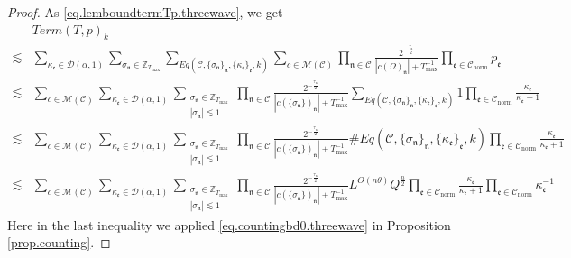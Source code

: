 \begin{proof}
As \eqref{eq.lemboundtermTp.threewave}, we get
\begin{equation}\label{eq.lemboundtermTpop.threewave}
\begin{split}
    &Term(T, p)_k
    \\
    \lesssim& \sum_{\kappa_{\mathfrak{e}}\in \mathcal{D}(\alpha,1)}\sum_{\sigma_{\mathfrak{n}}\in \mathbb{Z}_{T_{\text{max}}}}\sum_{Eq(\mathcal{C}, \{\sigma_{\mathfrak{n}}\}_{\mathfrak{n}}, \{\kappa_{\mathfrak{e}}\}_{\mathfrak{e}},k)} \sum_{c\in \mathscr{M}(\mathcal{C}) }\prod_{\mathfrak{n}\in \mathcal{C}}\frac{2^{-\frac{\tau_{\mathfrak{n}}}{2}}}{|c(\Omega)_{\mathfrak{n}}|+T^{-1}_{\text{max}}} \prod_{\mathfrak{e}\in \mathcal{C}_{\text{norm}}} p_{\mathfrak{e}}
    \\
    \lesssim &\sum_{c\in \mathscr{M}(\mathcal{C}) }\sum_{\kappa_{\mathfrak{e}}\in \mathcal{D}(\alpha,1)}\sum_{\substack{\sigma_{\mathfrak{n}}\in \mathbb{Z}_{T_{\text{max}}}\\ |\sigma_{\mathfrak{n}}|\lesssim 1}}\prod_{\mathfrak{n}\in \mathcal{C}}\frac{2^{-\frac{\tau_{\mathfrak{n}}}{2}}}{|c(\{\sigma_{\mathfrak{n}}\})_{\mathfrak{n}}|+T^{-1}_{\text{max}}} \sum_{Eq(\mathcal{C}, \{\sigma_{\mathfrak{n}}\}_{\mathfrak{n}}, \{\kappa_{\mathfrak{e}}\}_{\mathfrak{e}},k)} 1 \prod_{\mathfrak{e}\in \mathcal{C}_{\text{norm}}} \frac{\kappa_{\mathfrak{e}}}{\kappa_{\mathfrak{e}}+1}
    \\
    \lesssim &\sum_{c\in \mathscr{M}(\mathcal{C}) }\sum_{\kappa_{\mathfrak{e}}\in \mathcal{D}(\alpha,1)}\sum_{\substack{\sigma_{\mathfrak{n}}\in \mathbb{Z}_{T_{\text{max}}}\\ |\sigma_{\mathfrak{n}}|\lesssim 1}}\prod_{\mathfrak{n}\in \mathcal{C}}\frac{2^{-\frac{\tau_{\mathfrak{n}}}{2}}}{|c(\{\sigma_{\mathfrak{n}}\})_{\mathfrak{n}}|+T^{-1}_{\text{max}}} \#Eq(\mathcal{C}, \{\sigma_{\mathfrak{n}}\}_{\mathfrak{n}}, \{\kappa_{\mathfrak{e}}\}_{\mathfrak{e}},k) \prod_{\mathfrak{e}\in \mathcal{C}_{\text{norm}}} \frac{\kappa_{\mathfrak{e}}}{\kappa_{\mathfrak{e}}+1}
    \\
    \lesssim &\sum_{c\in \mathscr{M}(\mathcal{C}) }\sum_{\kappa_{\mathfrak{e}}\in \mathcal{D}(\alpha,1)}\sum_{\substack{\sigma_{\mathfrak{n}}\in \mathbb{Z}_{T_{\text{max}}}\\ |\sigma_{\mathfrak{n}}|\lesssim 1}}\prod_{\mathfrak{n}\in \mathcal{C}}\frac{2^{-\frac{\tau_{\mathfrak{n}}}{2}}}{|c(\{\sigma_{\mathfrak{n}}\})_{\mathfrak{n}}|+T^{-1}_{\text{max}}} L^{O(n\theta)} Q^{\frac{n}{2}} \prod_{\mathfrak{e}\in \mathcal{C}_{\text{norm}}} \frac{\kappa_{\mathfrak{e}}}{\kappa_{\mathfrak{e}}+1} \prod_{\mathfrak{e}\in \mathcal{C}_{\text{norm}}} \kappa_{\mathfrak{e}}^{-1}
\end{split}
\end{equation}
Here in the last inequality we applied \eqref{eq.countingbd0.threewave} in Proposition \ref{prop.counting}.


\end{proof}
